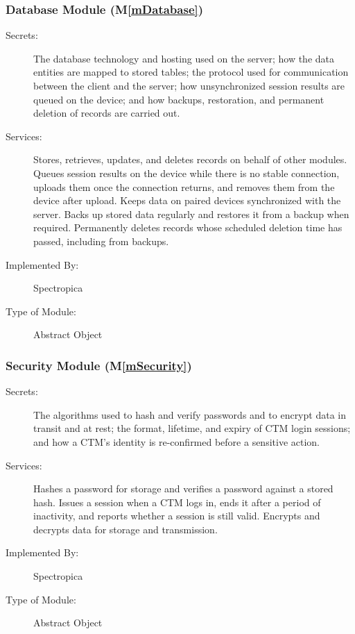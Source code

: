 \documentclass[12pt, titlepage]{article}
\newcommand{\mref}[1]{M\ref{#1}}
\begin{document}
\subsubsection{Database Module (\mref{mDatabase})}

\begin{description}
\item[Secrets:] The database technology and hosting used on the server; how the data entities are mapped to stored tables; the protocol used for communication between the client and the server; how unsynchronized session results are queued on the device; and how backups, restoration, and permanent deletion of records are carried out.

\item[Services:] Stores, retrieves, updates, and deletes records on behalf of other modules. Queues session results on the device while there is no stable connection, uploads them once the connection returns, and removes them from the device after upload. Keeps data on paired devices synchronized with the server. Backs up stored data regularly and restores it from a backup when required. Permanently deletes records whose scheduled deletion time has passed, including from backups.
\item[Implemented By:] Spectropica
\item[Type of Module:] Abstract Object
\end{description}

\subsubsection{Security Module (\mref{mSecurity})}

\begin{description}
\item[Secrets:] The algorithms used to hash and verify passwords and to encrypt data in transit and at rest; the format, lifetime, and expiry of CTM login sessions; and how a CTM's identity is re-confirmed before a sensitive action.
\item[Services:] Hashes a password for storage and verifies a password against a stored hash. Issues a session when a CTM logs in, ends it after a period of inactivity, and reports whether a session is still valid. Encrypts and decrypts data for storage and transmission.
\item[Implemented By:] Spectropica
\item[Type of Module:] Abstract Object
\end{description}
\end{document}
